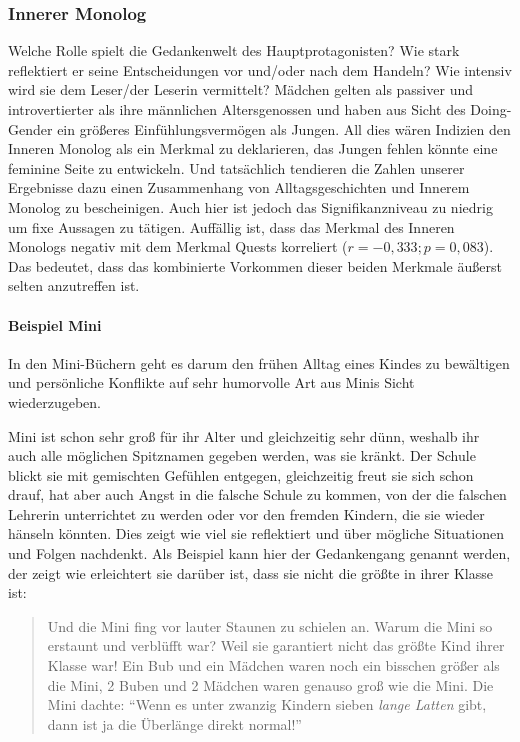 \subsubsection{Innerer Monolog}

Welche Rolle spielt die Gedankenwelt des Hauptprotagonisten? Wie stark
reflektiert er seine Entscheidungen vor und/oder nach dem Handeln? Wie
intensiv wird sie dem Leser/der Leserin vermittelt? Mädchen gelten als
passiver und introvertierter als ihre männlichen Altersgenossen und
haben aus Sicht des Doing-Gender ein größeres Einfühlungsvermögen als
Jungen. All dies wären Indizien den Inneren Monolog als ein Merkmal zu
deklarieren, das Jungen fehlen könnte eine feminine Seite zu entwickeln.
Und tatsächlich tendieren die Zahlen unserer Ergebnisse dazu einen
Zusammenhang von Alltagsgeschichten und Innerem Monolog zu bescheinigen.
Auch hier ist jedoch das Signifikanzniveau zu niedrig um fixe Aussagen
zu tätigen. Auffällig ist, dass das Merkmal des Inneren Monologs negativ
mit dem Merkmal Quests korreliert ($r= -0{,}333; p=0{,}083$). Das
bedeutet, dass das kombinierte Vorkommen dieser beiden Merkmale äußerst
selten anzutreffen ist.

\paragraph{Beispiel Mini}

In den Mini-Büchern geht es darum den frühen Alltag eines Kindes zu
bewältigen und persönliche Konflikte auf sehr humorvolle Art aus Minis
Sicht wiederzugeben.

Mini ist schon sehr groß für ihr Alter und gleichzeitig sehr dünn,
weshalb ihr auch alle möglichen Spitznamen gegeben werden, was sie
kränkt. Der Schule blickt sie mit gemischten Gefühlen entgegen,
gleichzeitig freut sie sich schon drauf, hat aber auch Angst in die
falsche Schule zu kommen, von der die falschen Lehrerin unterrichtet zu
werden oder vor den fremden Kindern, die sie wieder hänseln könnten.
Dies zeigt wie viel sie reflektiert und über mögliche Situationen und
Folgen nachdenkt. Als Beispiel kann hier der Gedankengang genannt
werden, der zeigt wie erleichtert sie darüber ist, dass sie nicht die
größte in ihrer Klasse ist:
\blockcquote[61]{Noestlinger2011}{Und die Mini fing vor lauter Staunen zu schielen an. \textelp{} Warum die Mini so erstaunt und verblüfft war? Weil sie garantiert nicht das größte Kind ihrer Klasse war! Ein Bub und ein Mädchen waren noch ein bisschen größer als die Mini, 2 Buben und 2 Mädchen waren genauso groß wie die Mini. Die Mini dachte: \enquote{Wenn es unter zwanzig Kindern sieben \emph{lange Latten} gibt, dann ist ja die Überlänge direkt normal!}}

